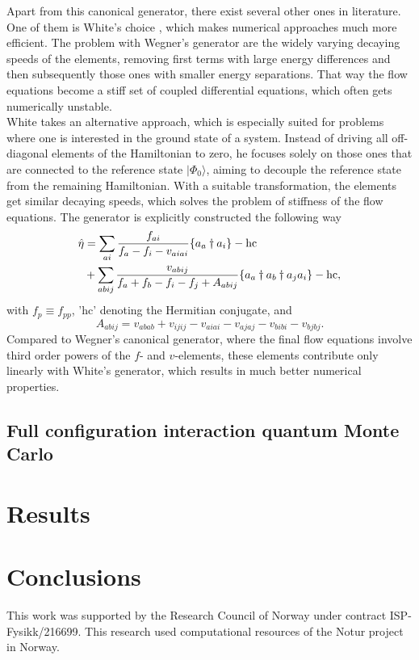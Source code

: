 \documentclass[aps,twocolumn,showpacs,floatfix,nofootinbib,preprintnumbers,superscriptaddress,amsmath,amssymb]{revtex4-1}
\begin{document}
Apart from this canonical generator, there exist several other ones in literature. One of them is White's choice \cite{White:cond-mat0201346}, which makes numerical approaches much more efficient. 
The problem with Wegner's generator are the widely varying decaying speeds of the elements, removing first terms with large energy differences and then subsequently those ones with smaller energy separations.  That way the flow equations become a stiff set of coupled differential equations, which often gets numerically unstable.\\
White takes an alternative approach, which is especially suited for problems where one is interested in the ground state of a system. Instead of driving all off-diagonal elements of the Hamiltonian to zero, he focuses solely on those ones that are connected to the reference state $|\Phi_0\rangle$, aiming to decouple the reference state from the remaining Hamiltonian. With a suitable transformation, the elements get similar decaying speeds, which solves the problem of stiffness of the flow equations.
The generator is explicitly constructed the following way \cite{PhysRevLett.106.222502,White:cond-mat0201346}
\begin{align}
\hat{\eta} &= \sum_{ai} \frac{f_{ai}}{f_a-f_i-v_{aiai}}\lbrace a_a\dagger a_i\rbrace -\text{hc} \notag \\
& + \sum_{abij} \frac{v_{abij}}{f_a+f_b-f_i-f_j+A_{abij}}\lbrace a_a\dagger a_b\dagger a_j a_i\rbrace - \text{hc},
\label{eq:WhiteFull}
\end{align}
with $f_p \equiv f_{pp}$, 'hc' denoting the Hermitian conjugate, and 
\[
A_{abij} = v_{abab} + v_{ijij} - v_{aiai} - v_{ajaj} - v_{bibi} - v_{bjbj}.
\label{eq:White7}
\]
Compared to Wegner's canonical generator, where the final flow equations involve third order powers of the $f$- and $v$-elements, these elements contribute only linearly with White's generator, which results in much better numerical properties.

\subsection{Full configuration interaction quantum Monte Carlo}




\section{Results}
\label{sec:results}

\section{Conclusions}
\label{sec:conclusions}
%
\begin{acknowledgments}
  This work was supported by
  the Research Council of Norway under contract ISP-Fysikk/216699. This research 
  used computational resources
  of the Notur project in Norway.
\end{acknowledgments}




\end{document}
